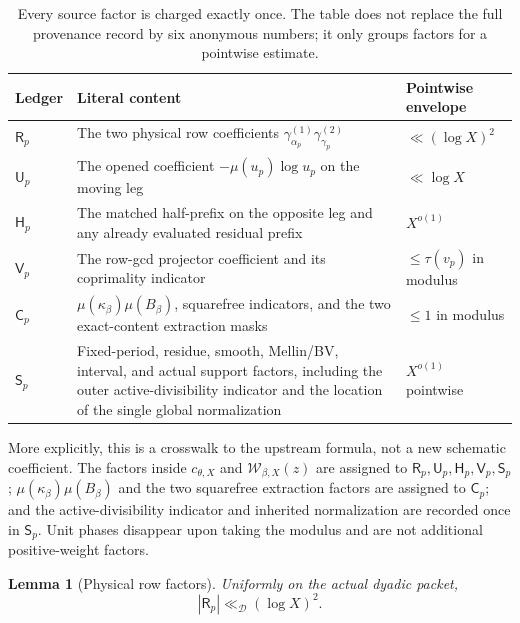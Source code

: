 \documentclass[11pt]{article}
\newtheorem{lemma}[theorem]{Lemma}
\theoremstyle{definition}
\theoremstyle{remark}
\begin{document}
\begin{table}[ht]
\centering
\small
\begin{tabularx}{\textwidth}{@{}
 >{\raggedright\arraybackslash}p{}
 >{\raggedright\arraybackslash}p{}
 >{\raggedright\arraybackslash}X@{}}
\toprule
Ledger & Literal content & Pointwise envelope\\
\midrule
\(\mathsf R_p\) &
The two physical row coefficients
\(\gamma_{\alpha_p}^{(1)}\gamma_{\gamma_p}^{(2)}\) &
\(\ll(\log X)^2\)\\
\(\mathsf U_p\) &
The opened coefficient \(-\mu(u_p)\log u_p\) on the moving leg &
\(\ll\log X\)\\
\(\mathsf H_p\) &
The matched half-prefix on the opposite leg and any already
evaluated residual prefix &
\(X^{o(1)}\)\\
\(\mathsf V_p\) &
The row-gcd projector coefficient and its coprimality indicator &
\(\le\tau(v_p)\) in modulus\\
\(\mathsf C_p\) &
\(\mu(\kappa_\beta)\mu(B_\beta)\), squarefree indicators, and
the two exact-content extraction masks &
\(\le1\) in modulus\\
\(\mathsf S_p\) &
Fixed-period, residue, smooth, Mellin/BV, interval, and actual
support factors, including the outer active-divisibility indicator
and the location of the single global normalization &
\(X^{o(1)}\) pointwise\\
\bottomrule
\end{tabularx}
\caption{Every source factor is charged exactly once.  The table
does not replace the full provenance record by six anonymous
numbers; it only groups factors for a pointwise estimate.}
\label{tab:factors}
\end{table}

More explicitly, this is a crosswalk to the upstream formula, not a
new schematic coefficient.  The factors inside \(c_{\theta,X}\) and
\(\mathcal W_{\beta,X}(z)\) are assigned to
\(\mathsf R_p,\mathsf U_p,\mathsf H_p,\mathsf V_p,\mathsf S_p\);
\(\mu(\kappa_\beta)\mu(B_\beta)\) and the two squarefree extraction
factors are assigned to \(\mathsf C_p\); and the active-divisibility
indicator and inherited normalization are recorded once in
\(\mathsf S_p\).  Unit phases disappear upon taking the modulus and
are not additional positive-weight factors.

\begin{lemma}[Physical row factors]
\label{lem:rows}
Uniformly on the actual dyadic packet,
\[
 |\mathsf R_p|\ll_{\mathscr D}(\log X)^2.
\]
\end{lemma}
\end{document}
